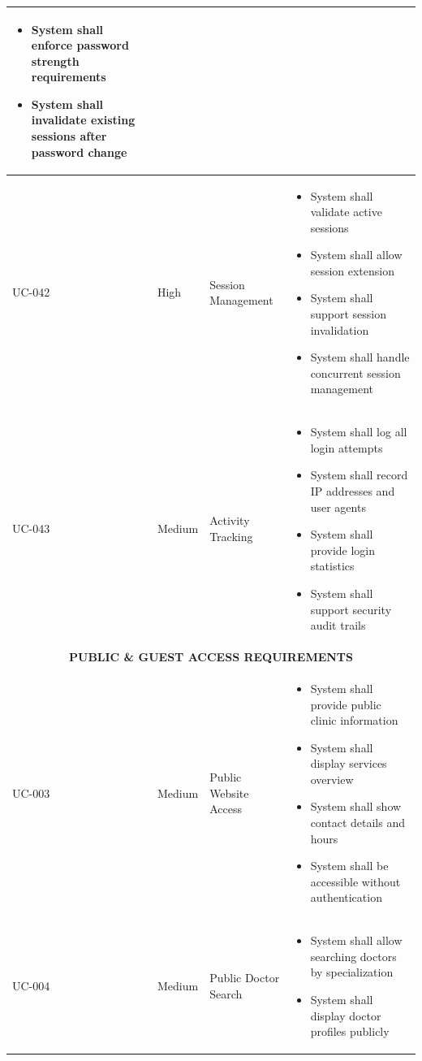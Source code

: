 \documentclass[12pt,a4paper]{article}
\begin{document}
\begin{longtable}{|p{1.2cm}|p{2.5cm}|p{3.5cm}|p{6.8cm}|}
\begin{itemize}[leftmargin=*,topsep=1pt,partopsep=0pt,parsep=0pt,itemsep=1pt]
\item System shall enforce password strength requirements
\item System shall invalidate existing sessions after password change
\end{itemize} \\
\hline
UC-042 & High & Session Management & 
\begin{itemize}[leftmargin=*,topsep=1pt,partopsep=0pt,parsep=0pt,itemsep=1pt]
\item System shall validate active sessions
\item System shall allow session extension
\item System shall support session invalidation
\item System shall handle concurrent session management
\end{itemize} \\
\hline
UC-043 & Medium & Activity Tracking & 
\begin{itemize}[leftmargin=*,topsep=1pt,partopsep=0pt,parsep=0pt,itemsep=1pt]
\item System shall log all login attempts
\item System shall record IP addresses and user agents
\item System shall provide login statistics
\item System shall support security audit trails
\end{itemize} \\
\hline
\multicolumn{4}{|c|}{\textbf{PUBLIC \& GUEST ACCESS REQUIREMENTS}} \\
\hline
UC-003 & Medium & Public Website Access & 
\begin{itemize}[leftmargin=*,topsep=1pt,partopsep=0pt,parsep=0pt,itemsep=1pt]
\item System shall provide public clinic information
\item System shall display services overview
\item System shall show contact details and hours
\item System shall be accessible without authentication
\end{itemize} \\
\hline
UC-004 & Medium & Public Doctor Search & 
\begin{itemize}[leftmargin=*,topsep=1pt,partopsep=0pt,parsep=0pt,itemsep=1pt]
\item System shall allow searching doctors by specialization
\item System shall display doctor profiles publicly

\end{itemize}
\end{longtable}
\end{document}
